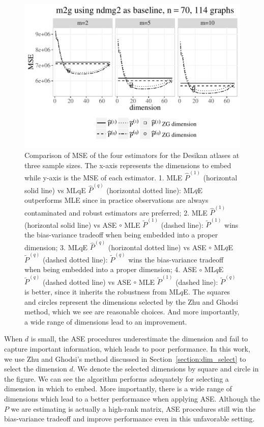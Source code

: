 \documentclass[a4paper]{article}
\renewcommand{\hat}{\widehat}
\begin{document}
\begin{figure}
\centering
\includegraphics[width=\textwidth]{CCI.pdf}
\caption{Comparison of MSE of the four estimators for the Desikan atlases at three sample sizes.
The x-axis represents the dimensions to embed while y-axis is the MSE of each estimator.
1. MLE $\hat{P}^{(1)}$ (horizontal solid line) vs MLqE $\hat{P}^{(q)}$ (horizontal dotted line):
ML$q$E outperforms MLE since in practice observations are always contaminated and robust estimators are preferred;
2. MLE $\hat{P}^{(1)}$ (horizontal solid line) vs ASE $\circ$ MLE $\widetilde{P}^{(1)}$ (dashed line):
$\widetilde{P}^{(1)}$ wins the bias-variance tradeoff when being embedded into a proper dimension; 
3. MLqE $\hat{P}^{(q)}$ (horizontal dotted line) vs ASE $\circ$ ML$q$E $\widetilde{P}^{(q)}$ (dashed dotted line):
$\widetilde{P}^{(q)}$ wins the bias-variance tradeoff when being embedded into a proper dimension; 
4.  ASE $\circ$ ML$q$E $\widetilde{P}^{(q)}$ (dashed dotted line) vs ASE $\circ$ MLE $\widetilde{P}^{(1)}$ (dashed line):
$\widetilde{P}^{(q)}$ is better, since it inherits the robustness from ML$q$E. The squares and circles represent the dimensions selected by the Zhu and Ghodsi method, which we see are reasonable choices. And more importantly, a wide range of dimensions lead to an improvement.
}
\label{fig:CCI}
\end{figure}

When $d$ is small, the ASE procedures underestimate the dimension and fail to capture important information, which leads to poor performance. In this work, we use Zhu and Ghodsi's method discussed in Section~\ref{section:dim_select} to select the dimension $d$. We denote the selected dimensions by square and circle in the figure. We can see the algorithm performs adequately for selecting a dimension in which to embed. More importantly, there is a wide range of dimensions which lead to a better performance when applying ASE. Although the $P$ we are estimating is actually a high-rank matrix, ASE procedures still win the bias-variance tradeoff and improve performance even in this unfavorable setting.
\end{document}
